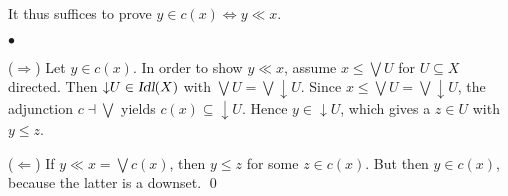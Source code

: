 \documentclass{LMCS}
\newif\ifignore \ignorefalse
\newcommand{\auxproof}[1]{
\ifignore\mbox{}\newline
\textbf{PROOF:} \dotfill\newline
{\it #1}\mbox{}\newline
\textbf{ENDPROOF}\dotfill
\fi}
\newcommand{\Cat}[1]{\ensuremath{\mathbf{#1}}}
\newcommand{\Idl}{\textsl{Idl}\xspace}
\newcommand{\Dcpo}{\Cat{Dcpo}\xspace}
\newcommand{\set}[2]{\{#1\;|\;#2\}}
\newcommand{\ex}[2]{\exists{#1}.\,#2}
\newcommand{\downset}{\mathop{\downarrow}\!}
\def\ddownset{\mathop{\rlap{$\downarrow$}\raisebox{.4ex}{$\downarrow$}}}
\begin{document}
{It thus suffices to prove $y\in c(x) \iff y\ll x$.
\begin{iteMize}{$\bullet$}
\item[($\Rightarrow$)] Let $y\in c(x)$. In order to show $y\ll x$,
  assume $x\leq \bigvee U$ for $U\subseteq X$ directed. Then $\downset
  U \in \Idl(X)$ with $\bigvee U = \bigvee\downset U$. Since
  $x\leq\bigvee U = \bigvee\downset U$, the adjunction $c\dashv
  \bigvee$ yields $c(x) \subseteq \downset U$. Hence $y\in\downset U$,
  which gives a $z\in U$ with $y\leq z$.

\item[($\Leftarrow$)] If $y\ll x = \bigvee c(x)$, then $y\leq z$ for
some $z\in c(x)$. But then $y\in c(x)$, because the latter is
a downset. \qed
\end{iteMize}
}







\auxproof{
A map $f\colon X\rightarrow Y$ in $\Dcpo$ is an
$\overline{T}$-coalgebra map if and only if for each $x\in X$,

$$\ddownset f(x)
=
\Idl(f)(\ddownset x)
=
\downset\set{f(y)}{y\in\ddownset x}.$$

\noindent First assume $f$ is such a coalgebra map.  If $y\ll x$, then
$f(y)$, being in the set on the right, is also in the set on the
left. Thus $f(y) \ll f(x)$, and $f$ is monotone.

In the reverse direction, assume $f$ is monotone with respect to
$\ll$. We show that the above equation holds.
$$\!\!\!\begin{array}[b]{rcl}
y\in\ddownset f(x)
& \Longrightarrow &
y \ll f(x) \\[1mm]
& \Longrightarrow &
\ex{z}{y \ll f(z) \mbox{ and } z\ll x} \quad\mbox{by interpolation}
   \quad\quad \\[1mm]
& \Longrightarrow &
\ex{z}{y \leq f(z) \mbox{ and } z\in\ddownset x} \\[1mm]
& \Longrightarrow &
y\in\downset\set{f(z)}{z\in\ddownset x} \\[2mm]
y\in\downset\set{f(z)}{z\in\ddownset x}
& \Longrightarrow &
\ex{z}{y \leq f(z) \mbox{ and } z\ll x} \\[1mm]
& \Longrightarrow &
\ex{z}{y \leq f(z) \mbox{ and } f(z)\ll f(x)}  
     \quad\rlap{since $f$ is monotone}\\[1mm]
& \Longrightarrow &
y \ll f(x) \\[1mm]
& \Longrightarrow &
y\in\ddownset f(x). 
\end{array}\eqno{\qEd}$$
}
\end{document}

